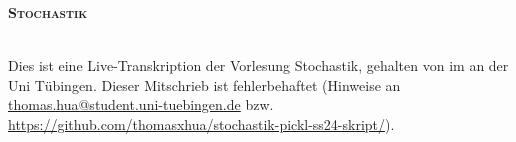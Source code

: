 

\usepackage{hyperref}
\usepackage{xurl}
\usepackage{tikz}
\usepackage{titlesec}
\newcommand{\pickl}[1]{\begin{center}\hrulefill\ \texttt{[ \textbf{#1} ]}\ \hrulefill\end{center}}
\newcommand{\PP}{\mathbb{P}}
\renewcommand{\thesection}{\Roman{section}}
\setcounter{tocdepth}{2}
\renewcommand{\contentsname}{Inhaltsverzeichnis}


\begin{center}
    {\huge{\textsc{\textbf{Stochastik}}}}
\end{center}
~\\
Dies ist eine Live-Transkription der Vorlesung Stochastik, gehalten von  im  an der Uni T\"ubingen. Dieser Mitschrieb ist fehlerbehaftet (Hinweise an \href{mailto:thomas.hua@student.uni-tuebingen.de}{\url{thomas.hua@student.uni-tuebingen.de}} bzw. \href{https://github.com/thomasxhua/stochastik-pickl-ss24-skript/}{\url{https://github.com/thomasxhua/stochastik-pickl-ss24-skript/}}).
\tableofcontents
\newpage












